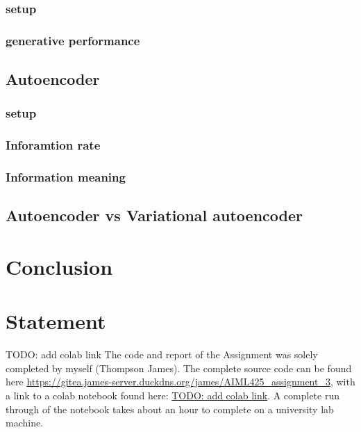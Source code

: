 \documentclass[conference,a4paper]{IEEEtran}
\begin{document}
\subsubsection{setup}

\subsubsection{generative performance}

\subsection{Autoencoder}

\subsubsection{setup}

\subsubsection{Inforamtion rate}

\subsubsection{Information meaning}

\subsection{Autoencoder vs Variational autoencoder}


\section{Conclusion}

\newpage
\section*{Statement}

TODO: add colab link
The code and report of the Assignment was solely completed by myself (Thompson James). The complete source code can be found here \url{https://gitea.james-server.duckdns.org/james/AIML425\_assignment\_3}, with a link to a colab notebook found here: \url{TODO: add colab link}. A complete run through of the notebook takes about an hour to complete on a university lab machine.
\end{document}
